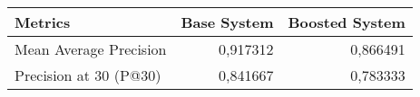 \begin{tabular}{lrr}
    \toprule
                   Metrics &  Base System &  Boosted System \\
    \midrule
         Mean Average Precision &     0,917312 &        0,866491 \\
    Precision at 30 (P@30) &     0,841667 &        0,783333 \\
    \bottomrule
    \end{tabular}
    